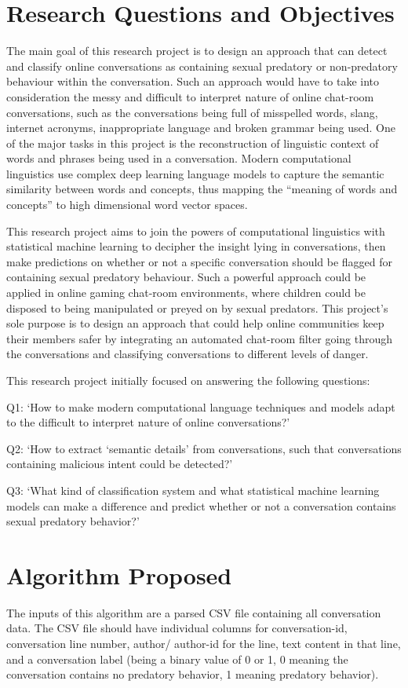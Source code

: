 \documentclass[11pt]{article}
\begin{document}
\section{Research Questions and Objectives}
\indent The main goal of this research project is to design an approach that can detect and classify online conversations as containing sexual predatory or non-predatory behaviour within the conversation. Such an approach would have to take into consideration the messy and difficult to interpret nature of online chat-room conversations, such as the conversations being full of misspelled words, slang, internet acronyms, inappropriate language and broken grammar being used. One of the major tasks in this project is the reconstruction of linguistic context of words and phrases being used in a conversation. Modern computational linguistics use complex deep learning language models to capture the semantic similarity between words and concepts, thus mapping the “meaning of words and concepts” to high dimensional word vector spaces. 

\indent This research project aims to join the powers of computational linguistics with statistical machine learning to decipher the insight lying in conversations, then make predictions on whether or not a specific conversation should be flagged for containing sexual predatory behaviour. Such a powerful approach could be applied in online gaming chat-room environments, where children could be disposed to being manipulated or preyed on by sexual predators. This project’s sole purpose is to design an approach that could help online communities keep their members safer by integrating an automated chat-room filter going through the conversations and classifying conversations to different levels of danger.

\indent This research project initially focused on answering the following questions:

Q1: ‘How to make modern computational language techniques and models adapt to the difficult to interpret nature of online conversations?’

Q2: ‘How to extract ‘semantic details’ from conversations, such that conversations containing malicious intent could be detected?’

Q3: ‘What kind of classification system and what statistical machine learning models can make a difference and predict whether or not a conversation contains sexual predatory behavior?’

\section{Algorithm Proposed}
The inputs of this algorithm are a parsed CSV file containing all conversation data. The CSV file should have individual columns for conversation-id, conversation line number, author/ author-id for the line, text content in that line, and a conversation label (being a binary value of 0 or 1, 0 meaning the conversation contains no predatory behavior, 1 meaning predatory behavior).
\end{document}
